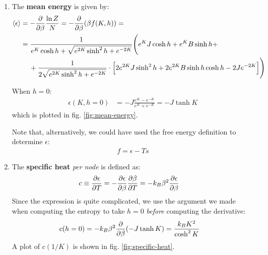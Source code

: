 \documentclass[12pt,a4paper]{report}
\begin{document}
\begin{enumerate}
        \item The \textbf{mean energy} is given by:
        \begin{align*}
            \langle \epsilon \rangle &= - \pdv{\beta} \frac{\ln Z}{N} = - \pdv{\beta} (\beta f(K,h)) =\\
            &= \frac{1}{e^K \cosh h + \sqrt{e^{2K} \sinh^2 h + e^{-2K}}} \Bigg( e^K J \cosh h + e^K B \sinh h +\\
            &\quad\> + \frac{1}{2 \sqrt{e^{2K} \sinh^2 h + e^{-2K}}} \cdot \Big[2 e^{2K} J \sinh^2 h + 2 e^{2K} B \sinh h \cosh h - 2 J e^{-2K} \Big]  \Bigg) 
        \end{align*} 

        When $h=0$:
        \begin{align}\label{eqn:mean-energy-pbc}
            \epsilon(K,h=0) &= -J \frac{e^K - e^{-K}}{e^K + e^{-K}} = - J \tanh K
        \end{align}
        which is plotted in fig. \ref{fig:mean-energy}.
        
        Note that, alternatively, we could have used the free energy definition to determine $\epsilon$:
        \begin{align*}
            f = \epsilon - T s
        \end{align*}
        

        \item The \textbf{specific heat} \textit{per node} is defined as:
        \begin{align*}
            c &\equiv \pdv{\epsilon}{T} = -\pdv{\epsilon}{\beta} \pdv{\beta}{T} = -k_B \beta^2 \pdv{\epsilon}{\beta}
        \end{align*}
        Since the expression is quite complicated, we use the argument we made when computing the entropy to take $h=0$ \textit{before} computing the derivative:
        \begin{align*}
            c(h=0) &= -k_B \beta^2 \pdv{\beta} (-J \tanh K) = \frac{k_B K^2}{\cosh^2 K}   
        \end{align*} 
        A plot of $c(1/K)$ is shown in fig. \ref{fig:specific-heat}.
        


\end{enumerate}
\end{document}
